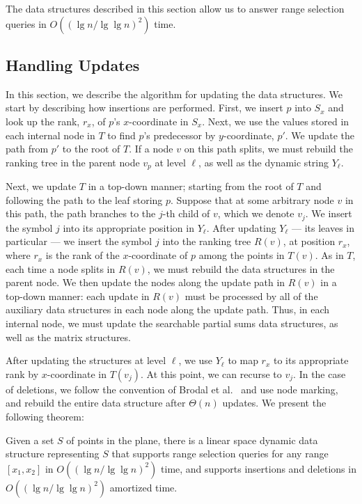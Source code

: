 \documentclass{llncs}
\begin{document}
\begin{lemma}
\label{lem:query}
The data structures described in this section allow us to answer range
selection queries in $O((\lg n/ \lg \lg n)^2)$ time.
\end{lemma}

\subsection{Handling Updates}

In this section, we describe the algorithm for updating the data
structures.  We start by describing how insertions are performed.
First, we insert $p$ into $S_x$ and look up the rank, $r_x$, of $p$'s
$x$-coordinate in $S_x$.  Next, we use the values stored in each
internal node in $T$ to find $p$'s predecessor by $y$-coordinate,
$p'$.  We update the path from $p'$ to the root of $T$.  If a node $v$
on this path splits, we must rebuild the ranking tree in the parent
node $v_p$ at level $\ell$, as well as the dynamic string $Y_{\ell}$.

Next, we update $T$ in a top-down manner; starting from the root of
$T$ and following the path to the leaf storing $p$.  Suppose that at
some arbitrary node $v$ in this path, the path branches to the $j$-th
child of $v$, which we denote $v_j$.  We insert the symbol $j$ into
its appropriate position in $Y_\ell$. After updating $Y_\ell$ --- its
leaves in particular --- we insert the symbol $j$ into the ranking
tree $R(v)$, at position $r_x$, where $r_x$ is the rank of the
$x$-coordinate of $p$ among the points in $T(v)$.  As in $T$, each
time a node splits in $R(v)$, we must rebuild the data structures in
the parent node.  We then update the nodes along the update path in
$R(v)$ in a top-down manner: each update in $R(v)$ must be processed
by all of the auxiliary data structures in each node along the update
path.  Thus, in each internal node, we must update the searchable
partial sums data structures, as well as the matrix structures.

After updating the structures at level $\ell$, we use $Y_\ell$ to map
$r_x$ to its appropriate rank by $x$-coordinate in $T(v_j)$.  At this
point, we can recurse to $v_j$.  In the case of deletions, we follow
the convention of Brodal et al.~\cite{BGJS10} and use node marking,
and rebuild the entire data structure after $\Theta(n)$ updates.  We
present the following theorem:

\begin{theorem}\label{thm:main}
Given a set $S$ of points in the plane, there is a linear space
dynamic data structure representing $S$ that supports range selection
queries for any range $[x_1,x_2]$ in $O((\lg n / \lg \lg n)^2)$ time,
and supports insertions and deletions in $O((\lg n / \lg \lg n)^2)$
amortized time.
\end{theorem}
\end{document}
